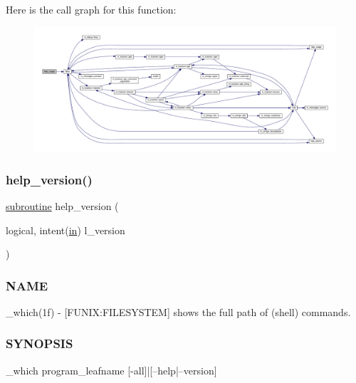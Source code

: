 Here is the call graph for this function\+:
\nopagebreak
\begin{figure}[H]
\begin{center}
\leavevmode
\includegraphics[width=350pt]{__which_8f90_a3e09a3b52ee8fb04eeb93fe5761626a8_cgraph}
\end{center}
\end{figure}
\mbox{\label{__which_8f90_a39c21619b08a3c22f19e2306efd7f766}} 
\subsubsection{\texorpdfstring{help\+\_\+version()}{help\_version()}}
{\footnotesize\ttfamily \hyperlink{M__stopwatch_83_8txt_acfbcff50169d691ff02d4a123ed70482}{subroutine} help\+\_\+version (\begin{DoxyParamCaption}\item[{logical, intent(\hyperlink{M__journal_83_8txt_afce72651d1eed785a2132bee863b2f38}{in})}]{l\+\_\+version }\end{DoxyParamCaption})}



\subsubsection*{N\+A\+ME}

\+\_\+which(1f) -\/ \mbox{[}F\+U\+N\+IX\+:F\+I\+L\+E\+S\+Y\+S\+T\+EM\mbox{]} shows the full path of (shell) commands. 

\subsubsection*{S\+Y\+N\+O\+P\+S\+IS}

\begin{DoxyVerb}    _which program_leafname [-all]|[--help|--version]
\end{DoxyVerb}


